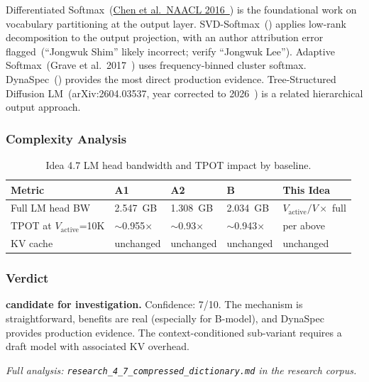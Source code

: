 \documentclass[11pt]{article}
\begin{document}
Differentiated Softmax~(\href{https://aclanthology.org/N16-1085}{Chen et al.\ NAACL 2016~\cite{ChenDiffSoftmax2016}}) is the foundational work on vocabulary partitioning at the output layer. SVD-Softmax~(\cite{SVDSoftmax2023}) applies low-rank decomposition to the output projection, with an author attribution error flagged~(``Jongwuk Shim'' likely incorrect; verify ``Jongwuk Lee''). Adaptive Softmax~(Grave et al.\ 2017~\cite{GraveAdaptiveSoftmax2017}) uses frequency-binned cluster softmax. DynaSpec~(\cite{DynaSpec2024}) provides the most direct production evidence. Tree-Structured Diffusion LM~(arXiv:2604.03537, year corrected to 2026~\cite{TreeDiffusionLM2026}) is a related hierarchical output approach.

\subsubsection*{Complexity Analysis}

\begin{table}[h]
\centering
\caption{Idea 4.7 LM head bandwidth and TPOT impact by baseline.}
\small
\begin{tabular}{lllll}
\toprule
Metric & A1 & A2 & B & This Idea \\
\midrule
Full LM head BW & 2.547~GB & 1.308~GB & 2.034~GB & $V_\text{active}/V \times$ full \\
TPOT at $V_\text{active}$=10K & $\sim$0.955$\times$ & $\sim$0.93$\times$ & $\sim$0.943$\times$ & per above \\
KV cache & unchanged & unchanged & unchanged & unchanged \\
\bottomrule
\end{tabular}
\end{table}

\subsubsection*{Verdict}

\noindent\textbf{candidate for investigation.} Confidence: 7/10. The mechanism is straightforward, benefits are real (especially for B-model), and DynaSpec provides production evidence. The context-conditioned sub-variant requires a draft model with associated KV overhead.

\par\noindent\textit{Full analysis: \texttt{research\_4\_7\_compressed\_dictionary.md} in the research corpus.}

\end{document}

